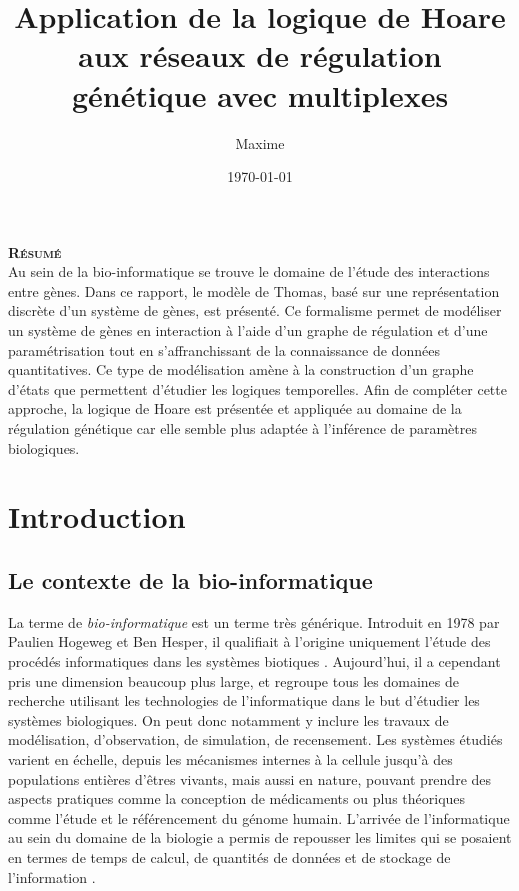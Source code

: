\documentclass[fleqn,11pt]{report}
\title{Application de la logique de Hoare\\aux réseaux de régulation génétique avec multiplexes}
\author{Maxime \bsc{Folschette}}
\date{\today}
\begin{document}
\maketitle
\tableofcontents


\chapter*{}
\noindent \Large \textbf{\textsc{Résumé}}\\

\normalsize
\noindent
Au sein de la bio-informatique se trouve le domaine de l'étude des interactions entre gènes.
Dans ce rapport, le modèle de Thomas, basé sur une représentation discrète d'un système de gènes, est présenté. Ce formalisme permet de modéliser un système de gènes en interaction à l'aide d'un graphe de régulation et d'une paramétrisation tout en s'affranchissant de la connaissance de données quantitatives. Ce type de modélisation amène à la construction d'un graphe d'états que permettent d'étudier les logiques temporelles. Afin de compléter cette approche, la logique de Hoare est présentée et appliquée au domaine de la régulation génétique car elle semble plus adaptée à l'inférence de paramètres biologiques.

\chapter*{Introduction}

\section*{Le contexte de la bio-informatique}
La terme de \emph{bio-informatique} est un terme très générique. Introduit en 1978 par Paulien Hogeweg et Ben Hesper, il qualifiait à l'origine uniquement l'étude des procédés informatiques dans les systèmes biotiques \cite{wikipedia-bioinformatics}. Aujourd'hui, il a cependant pris une dimension beaucoup plus large, et regroupe tous les domaines de recherche utilisant les technologies de l'informatique dans le but d'étudier les systèmes biologiques. On peut donc notamment y inclure les travaux de modélisation, d'observation, de simulation, de recensement. Les systèmes étudiés varient en échelle, depuis les mécanismes internes à la cellule jusqu'à des populations entières d'êtres vivants, mais aussi en nature, pouvant prendre des aspects pratiques comme la conception de médicaments ou plus théoriques comme l'étude et le référencement du génome humain. L'arrivée de l'informatique au sein du domaine de la biologie a permis de repousser les limites qui se posaient en termes de temps de calcul, de quantités de données et de stockage de l'information \cite{lingep-nilges-bioinformatics}.
\end{document}
